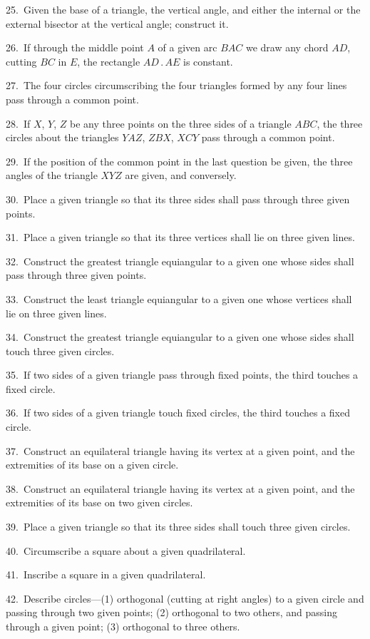 \documentclass[oneside]{book}
\begin{document}
\begin{footnotesize}
25.~Given the base of a triangle, the vertical angle, and either
the internal or the external bisector at the vertical angle; construct
it.

26.~If through the middle point $A$ of a given arc $BAC$ we
draw any chord $AD$, cutting $BC$ in $E$, the rectangle $AD\,.\,AE$ is
constant.

27.~The four circles circumscribing the four triangles formed
by any four lines pass through a common point.

28.~If $X$, $Y$, $Z$ be any three points on the three sides of a triangle
$ABC$, the three circles about the triangles $YAZ$, $ZBX$, $XCY$
pass through a common point.

29.~If the position of the common point in the last question be
given, the three angles of the triangle $XYZ$ are given, and conversely.

30.~Place a given triangle so that its three sides shall pass
through three given points.

31.~Place a given triangle so that its three vertices shall lie on
three given lines.

32.~Construct the greatest triangle equiangular to a given one
whose sides shall pass through three given points.

33.~Construct the least triangle equiangular to a given one
whose vertices shall lie on three given lines.

34.~Construct the greatest triangle equiangular to a given one
whose sides shall touch three given circles.

35.~If two sides of a given triangle pass through fixed points,
the third touches a fixed circle.

36.~If two sides of a given triangle touch fixed circles, the
third touches a fixed circle.

37.~Construct an equilateral triangle having its vertex at a
given point, and the extremities of its base on a given circle.

38.~Construct an equilateral triangle having its vertex at a
given point, and the extremities of its base on two given circles.

39.~Place a given triangle so that its three sides shall touch
three given circles.

40.~Circumscribe a square about a given quadrilateral.

41.~Inscribe a square in a given quadrilateral.

42.~Describe circles---(1) orthogonal (cutting at right angles) to
a given circle and passing through two given points; (2) orthogonal
to two others, and passing through a given point; (3) orthogonal
to three others.



\end{footnotesize}
\end{document}
